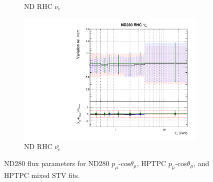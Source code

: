\begin{figure}[t]
\begin{subfigure}{0.45\textwidth}
  \caption{ND RHC $\nu_{e}$}
\end{subfigure}
\begin{subfigure}{0.45\textwidth}
  \centering
  \includegraphics[width=0.75\linewidth]{figs/hptpcfitsflux_7}
  \caption{ND RHC $\bar{\nu_e}$}
\end{subfigure}
\caption{ND280 flux parameters for ND280 $p_{\mu}$-cos$\theta_{\mu}$, HPTPC $p_{\mu}$-cos$\theta_{\mu}$, and HPTPC mixed STV fits.}
\label{fig:hptpcfluxND}
\end{figure}

